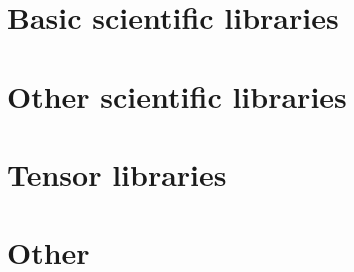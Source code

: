 \documentclass[oneside]{book}
\begin{document}
\part{Basic scientific libraries}




\part{Other scientific libraries}







\part{Tensor libraries}




\part{Other}

\end{document}
